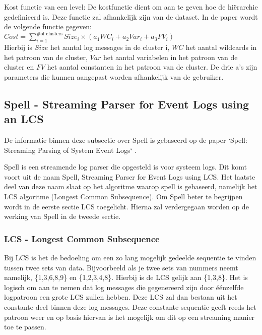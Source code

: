 \begin{itemize}
    \subitem Kost functie van een level: De kostfunctie dient om aan te geven hoe de hiërarchie gedefinieerd is. Deze functie zal afhankelijk zijn van de dataset. In de paper wordt de volgende functie gegeven:\\
    \(Cost = \sum_{i=1}^{\text{\# of clusters}} Size_{i} \times (a_{1}WC_{i} + a_{2}Var_{i} + a_{3}FV_{i})\)\\
    
    Hierbij is $Size$ het aantal log messages in de cluster i, $WC$ het aantal wildcards in het patroon van de cluster, $Var$ het aantal variabelen in het patroon van de cluster en $FV$ het aantal constanten in het patroon van de cluster. De drie a's zijn parameters die kunnen aangepast worden afhankelijk van de gebruiker.
\end{itemize}

\subsection{Spell - Streaming Parser for Event Logs using an LCS}
De informatie binnen deze subsectie over Spell is gebaseerd op de paper `Spell: Streaming Parsing of System Event Logs` \autocite{du2016spell}.

Spell is een streamende log parser die opgesteld is voor systeem logs. Dit komt voort uit de naam Spell, Streaming Parser for Event Logs using LCS. Het laatste deel van deze naam slaat op het algoritme waarop spell is gebaseerd, namelijk het LCS algoritme (Longest Common Subsequence). Om Spell beter te begrijpen wordt in de eerste sectie LCS toegelicht. Hierna zal verdergegaan worden op de werking van Spell in de tweede sectie.

\subsubsection{LCS - Longest Common Subsequence}
Bij LCS is het de bedoeling om een zo lang mogelijk gedeelde sequentie te vinden tussen twee sets van data. Bijvoorbeeld als je twee sets van nummers neemt namelijk, \{1,3,6,8,9\} en \{1,2,3,4,8\}. Hierbij is de LCS gelijk aan \{1,3,8\}. Het is logisch om aan te nemen dat log messages die gegenereerd zijn door éénzelfde logpatroon een grote LCS zullen hebben. Deze LCS zal dan bestaan uit het constante deel binnen deze log messages. Deze constante sequentie geeft reeds het patroon weer en op basis hiervan is het mogelijk om dit op een streaming manier toe te passen.

